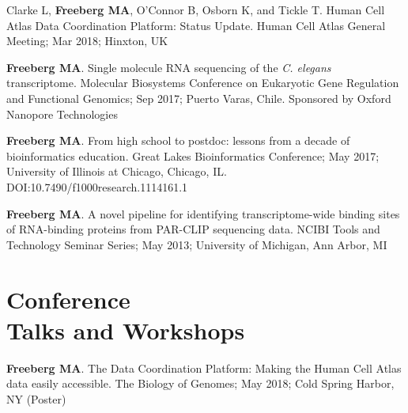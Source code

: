 \documentclass[margin,line]{res}
\begin{document}
\begin{resume}

Clarke L, {\bf Freeberg MA}, O'Connor B, Osborn K, and Tickle T. Human Cell Atlas Data Coordination Platform: Status Update. Human Cell Atlas General Meeting; Mar 2018; Hinxton, UK

{\bf Freeberg MA}. Single molecule RNA sequencing of the {\em C. elegans} transcriptome. Molecular Biosystems Conference on Eukaryotic Gene Regulation and Functional Genomics; Sep 2017; Puerto Varas, Chile. Sponsored by Oxford Nanopore Technologies

{\bf Freeberg MA}. From high school to postdoc: lessons from a decade of bioinformatics education. Great Lakes Bioinformatics Conference; May 2017; University of Illinois at Chicago, Chicago, IL. DOI:10.7490/f1000research.1114161.1

{\bf Freeberg MA}. A novel pipeline for identifying transcriptome-wide binding sites of RNA-binding proteins from PAR-CLIP sequencing data. NCIBI Tools and Technology Seminar Series; May 2013; University of Michigan, Ann Arbor, MI




\section{\sc Conference\\ Talks and Workshops}

{\bf Freeberg MA}. The Data Coordination Platform: Making the Human Cell Atlas data easily accessible. The Biology of Genomes; May 2018; Cold Spring Harbor, NY (Poster)


\end{resume}
\end{document}
